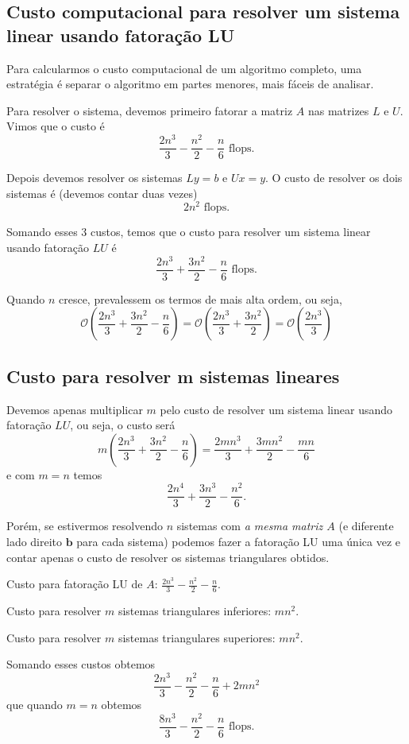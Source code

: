 \subsection{Custo computacional para resolver um sistema linear usando fatoração LU}
Para calcularmos o custo computacional de um algoritmo completo, uma estratégia é separar o algoritmo em partes menores, mais fáceis de analisar.

Para resolver o sistema, devemos primeiro fatorar a matriz $A$ nas matrizes $L$ e $U$. Vimos que o custo é
$$\frac{2n^3}{3}-\frac{n^2}{2}-\frac{n}{6} \text{~flops}.$$

Depois devemos resolver os sistemas $Ly=b$ e $Ux=y$. O custo de resolver os dois sistemas é (devemos contar duas vezes)
$$ 2 n^2\text{~flops}.$$

Somando esses $3$ custos, temos que o custo para resolver um sistema linear usando fatoração $LU$ é
$$\frac{2n^3}{3}+\frac{3n^2}{2}-\frac{n}{6} \text{~flops}.$$

Quando $n$ cresce, prevalessem os termos de mais alta ordem, ou seja,
$$\mathcal{O}(\frac{2n^3}{3}+\frac{3n^2}{2}-\frac{n}{6}) = \mathcal{O}(\frac{2n^3}{3}+\frac{3n^2}{2})=\mathcal{O}(\frac{2n^3}{3})$$

\subsection{Custo para resolver m sistemas lineares}
Devemos apenas multiplicar $m$ pelo custo de resolver um sistema linear usando fatoração $LU$, ou seja, o custo será
$$m(\frac{2n^3}{3}+\frac{3n^2}{2}-\frac{n}{6})=\frac{2mn^3}{3}+\frac{3mn^2}{2}-\frac{mn}{6}$$
e com $m=n$ temos
$$\frac{2n^4}{3}+\frac{3n^3}{2}-\frac{n^2}{6}.$$

Porém, se estivermos resolvendo $n$ sistemas com \textit{a mesma matriz $A$ }(e diferente lado direito $\pmb b$ para cada sistema) podemos fazer a fatoração LU uma única vez e contar apenas o custo de resolver os sistemas triangulares obtidos.

Custo para fatoração LU de $A$: $\frac{2n^3}{3}-\frac{n^2}{2}-\frac{n}{6}$.

Custo para resolver $m$ sistemas triangulares inferiores: $m n^2 $.

Custo para resolver $m$ sistemas triangulares superiores: $m n^2 $.

Somando esses custos obtemos
$$\frac{2n^3}{3}-\frac{n^2}{2}-\frac{n}{6}+2m n^2 $$
que quando $m=n$ obtemos
$$\frac{8n^3}{3}-\frac{n^2}{2}-\frac{n}{6} \text{~flops}.$$


